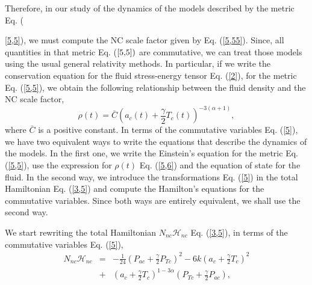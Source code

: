 \documentclass[12pt]{article}
\newcommand{\be}{\begin{equation}}
\newcommand{\ee}{\end{equation}}
\newcommand{\0}{{(0)}}
\newcommand{\1}{{(1)}}
\newcommand{\2}{{(2)}}
\begin{document}
Therefore, in our study of the dynamics of the models described by the metric Eq. ({\ref{5,5}), we must compute the NC scale factor given by Eq. (\ref{5,55}).
Since, all quantities in that metric Eq. ($\ref{5,5})$ are
commutative, we can treat those models using the usual general relativity methods. In particular, if we write the conservation equation for the
fluid stress-energy tensor Eq. (\ref{2}), for the metric Eq. (\ref{5,5}), we obtain the following relationship between the fluid density and
the NC scale factor,
\be
\label{5,6}
\rho(t) = \bar{C} \left(a_c(t) + \frac{\gamma}{2}T_c(t)\right)^{-3(\alpha + 1)},
\ee
where $\bar{C}$ is a positive constant. In terms of the commutative variables Eq. (\ref{5}), we have two equivalent ways to write the equations 
that describe the dynamics of the models. In the first one, we write the Einstein's equation for the metric Eq. (\ref{5,5}), use the expression 
for $\rho(t)$ Eq. (\ref{5,6}) and the equation of state for the fluid. In the second way, we introduce the transformations Eq. (\ref{5}) in the 
total Hamiltonian Eq. (\ref{3,5}) and compute the Hamilton's equations for the commutative variables. Since both ways are entirely equivalent, we 
shall use the second way.

We start rewriting the total Hamiltonian $N_{nc} {\mathcal{H}}_{nc}$ Eq. (\ref{3,5}), in terms of the commutative variables Eq. (\ref{5}),
\begin{eqnarray}
\label{6}
N_{nc} {\mathcal{H}}_{nc} & = & -\frac{1}{24} \left( P_{ac} + \frac{\gamma}{2}P_{Tc} \right)^2 
- 6k \left( a_c + \frac{\gamma}{2}T_c \right)^2\nonumber\\
& + & \left(a_c + \frac{\gamma}{2}T_c\right)^{1-3\alpha} \left(P_{Tc} + \frac{\gamma}{2}P_{ac}\right),  
\end{eqnarray}

}
\end{document}
